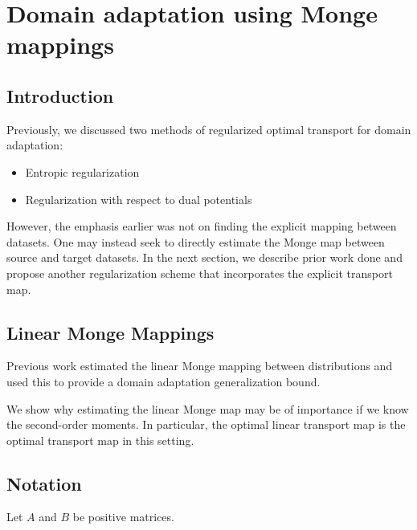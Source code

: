 \chapter{Domain adaptation using Monge mappings}

\section*{Introduction}
Previously, we discussed two methods of regularized optimal transport for domain adaptation:
\begin{itemize}
	\item Entropic regularization
	\item Regularization with respect to dual potentials
\end{itemize}

However, the emphasis earlier was not on finding the explicit mapping between datasets. One may instead seek to directly estimate the Monge map between source and target datasets. In the next section, we describe prior work done and propose another regularization scheme that incorporates the explicit transport map.

\section*{Linear Monge Mappings}
Previous work \cite{Flamary2019} estimated the linear Monge mapping between distributions and used this to provide a domain adaptation generalization bound.

We show why estimating the linear Monge map may be of importance if we know the second-order moments. In particular, the optimal linear transport map is the optimal transport map in this setting.



\section*{Notation}

Let $A$ and $B$ be positive matrices.

